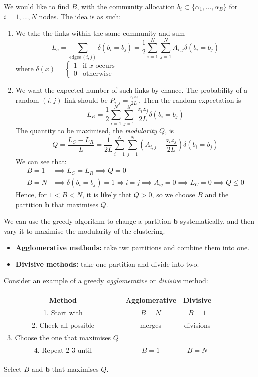 \documentclass[12pt]{article}
\theoremstyle{definition}
\newcommand{\br}[1]{\left({#1}\right)}
\begin{document}
We would like to find $B$, with the community allocation $b_i\subset\{\alpha_1,...,\alpha_B\}$ for $i=1,...,N$ nodes. The idea is as such: 
\begin{enumerate}
    \item We take the links within the same community and sum
    \[ L_c = \sum_{\mathrm{edges\  }(i,j)} \delta(b_i =b_j) = \frac12 \sum_{i=1}^N \sum_{j=1}^N A_{i,j} \delta(b_i = b_j)\]
    where $\delta(x)=\begin{cases} 1 & \text{if $x$ occurs } \\ 0 & \text{otherwise}\end{cases}$
    \item We want the expected number of such links by chance. The probability of a random $(i,j)$ link should be $P_{i,j} = \frac{z_iz_j}{2L}$. Then the random expectation is
    \[ L_R = \frac12 \sum_{i=1}^N \sum_{j=1}^N\ \frac{z_i z_j}{2L} \delta(b_i = b_j)\]
    The quantity to be maximised, the \textit{modularity} $Q$, is 
    \[
        Q=\frac{L_C-L_R}{L}=\frac{1}{2L}\sum_{i=1}^N \sum_{j=1}^N \br{A_{i,j}-\frac{z_iz_j}{2L}} \delta(b_i = b_j)
    \]
    We can see that: 
    \begin{align*}
        B=1 &\implies L_C=L_R\implies Q=0 \\ 
        B=N &\implies \delta(b_i=b_j)=1\iff i=j\implies A_{ij}=0\implies L_C=0\implies Q\leq 0
    \end{align*}
    Hence, for $1<B<N$, it is likely that $Q>0$, so we choose $B$ and the partition  $\boldsymbol{b}$ that maximises $Q$.
\end{enumerate}

We can use the greedy algorithm to change a partition $\boldsymbol{b}$ systematically, and then vary it to maximise the modularity of the clustering.
\begin{itemize}
    \item \textbf{Agglomerative methods:} take two partitions and combine them into one. 
    \item \textbf{Divisive methods:} take one partition and divide into two. 
\end{itemize}

Consider an example of a greedy \textit{agglomerative} or \textit{divisive} method: 

\begin{table}[h]
    \centering
    \begin{tabular}{c|cc}
       Method  & Agglomerative & Divisive \\
       \hline
       1. Start with  & $B=N$ & $B=1$\\
       2. Check all possible & merges &divisions\\
        3. Choose the one that maximises $Q$ &&\\
        4. Repeat 2-3 until& $B=1$ & $B=N$
    \end{tabular}
\end{table}
Select $B$ and $\boldsymbol{b}$ that maximises $Q$.
\end{document}
